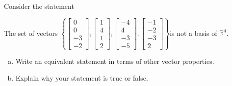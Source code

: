 
\begin{exerciseStatement}


Consider the statement 
\begin{center}\begin{minipage}{0.8\textwidth}
 The set of vectors \( \left\{ \left[\begin{array}{c}
0 \\
0 \\
-3 \\
-2
\end{array}\right] , \left[\begin{array}{c}
1 \\
4 \\
1 \\
2
\end{array}\right] , \left[\begin{array}{c}
-4 \\
4 \\
-3 \\
-5
\end{array}\right] , \left[\begin{array}{c}
-1 \\
-2 \\
-3 \\
2
\end{array}\right] \right\} \)is not a basis of \(\mathbb{R}^4\). 
\end{minipage}\end{center}
    


\begin{enumerate}[(a)]
\item  Write an equivalent statement in terms of other vector properties.
\item  Explain why your statement is true or false.
\end{enumerate}
    
\end{exerciseStatement}
    
